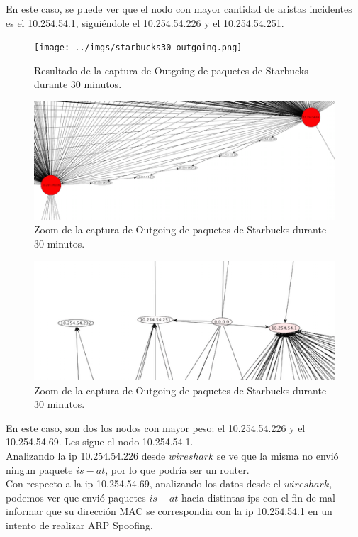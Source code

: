 \documentclass[10pt, a4paper]{article}
\begin{document}
En este caso, se puede ver que el nodo con mayor cantidad de aristas incidentes es el 10.254.54.1, siguiéndole el 10.254.54.226 y el 10.254.54.251.

\begin{figure}[H] %
\begin{center}
\texttt{[image: ../imgs/starbucks30-outgoing.png]}
\caption{Resultado de la captura de Outgoing de paquetes de Starbucks durante 30 minutos.}
\end{center}
\end{figure}

\begin{figure}[H] %
\begin{center}
\includegraphics[width=450pt]{../imgs/zoom-starbucks-outgoing.png}
\caption{Zoom de la captura de Outgoing de paquetes de Starbucks durante 30 minutos.}
\end{center}
\end{figure}

\begin{figure}[H] %
\begin{center}
\includegraphics[width=450pt]{../imgs/zoom-starbucks-outgoing2.png}
\caption{Zoom de la captura de Outgoing de paquetes de Starbucks durante 30 minutos.}
\end{center}
\end{figure}

En este caso, son dos los nodos con mayor peso: el 10.254.54.226 y el 10.254.54.69. Les sigue el nodo 10.254.54.1. \\
Analizando la ip 10.254.54.226 desde $wireshark$ se ve que la misma no envió ningun paquete $is-at$, por lo que podría ser un router.\\
Con respecto a la ip 10.254.54.69, analizando los datos desde el $wireshark$, podemos ver que envió paquetes $is-at$ hacia distintas ips con el fin de mal informar que su dirección MAC se correspondia con la ip 10.254.54.1 en un intento de realizar ARP Spoofing.
\end{document}
